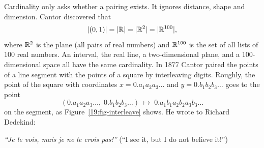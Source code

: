 Cardinality only asks whether a pairing exists. It ignores distance, shape and dimension. Cantor discovered that
\[
|(0, 1)| = |\mathbb{R}| = |\mathbb{R}^2| = |\mathbb{R}^{100}|,
\]
where $\mathbb{R}^2$ is the plane (all pairs of real numbers) and $\mathbb{R}^{100}$ is the set of all lists of $100$ real numbers. An interval, the real line, a two-dimensional plane, and a $100$-dimensional space all have the same cardinality. In 1877 Cantor paired the points of a line segment with the points of a square by interleaving digits. Roughly, the point of the square with coordinates $x = 0.a_1a_2a_3\ldots$ and $y = 0.b_1b_2b_3\ldots$ goes to the point
\[
(0.a_1a_2a_3\ldots,\; 0.b_1b_2b_3\ldots) \;\longmapsto\; 0.a_1b_1a_2b_2a_3b_3\ldots
\]
on the segment, as Figure~\ref{19:fig-interleave} shows. He wrote to Richard Dedekind:
\begin{center}
\emph{``Je le vois, mais je ne le crois pas!''} (``I see it, but I do not believe it!'')
\end{center}

